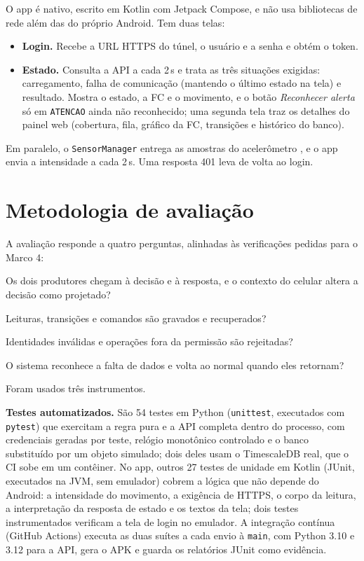 \documentclass[12pt,a4paper]{article}
\begin{document}
O app é nativo, escrito em Kotlin com Jetpack Compose, e não usa bibliotecas de rede além das do próprio Android.
Tem duas telas:
\begin{itemize}
  \item \textbf{Login.} Recebe a URL HTTPS do túnel, o usuário e a senha e obtém o token.
  \item \textbf{Estado.} Consulta a API a cada 2\,s e trata as três situações exigidas: carregamento, falha de comunicação (mantendo o último estado na tela) e resultado. Mostra o estado, a FC e o movimento, e o botão \emph{Reconhecer alerta} só em \texttt{ATENCAO} ainda não reconhecido; uma segunda tela traz os detalhes do painel web (cobertura, fila, gráfico da FC, transições e histórico do banco).
\end{itemize}
Em paralelo, o \texttt{SensorManager} entrega as amostras do acelerômetro \cite{androidsensors}, e o app envia a intensidade a cada 2\,s.
Uma resposta 401 leva de volta ao login.

\section{Metodologia de avaliação}\label{sec:metodo}

A avaliação responde a quatro perguntas, alinhadas às verificações pedidas para o Marco 4:
\begin{description}[leftmargin=0.6cm, style=nextline]
  \item[Q1 -- Fluxo e contexto] Os dois produtores chegam à decisão e à resposta, e o contexto do celular altera a decisão como projetado?
  \item[Q2 -- Persistência] Leituras, transições e comandos são gravados e recuperados?
  \item[Q3 -- Segurança] Identidades inválidas e operações fora da permissão são rejeitadas?
  \item[Q4 -- Falha e recuperação] O sistema reconhece a falta de dados e volta ao normal quando eles retornam?
\end{description}

Foram usados três instrumentos.

\textbf{Testes automatizados.}
São 54 testes em Python (\texttt{unittest}, executados com \texttt{pytest}) que exercitam a regra pura e a API completa dentro do processo, com credenciais geradas por teste, relógio monotônico controlado e o banco substituído por um objeto simulado; dois deles usam o TimescaleDB real, que o CI sobe em um contêiner.
No app, outros 27 testes de unidade em Kotlin (JUnit, executados na JVM, sem emulador) cobrem a lógica que não depende do Android: a intensidade do movimento, a exigência de HTTPS, o corpo da leitura, a interpretação da resposta de estado e os textos da tela; dois testes instrumentados verificam a tela de login no emulador.
A integração contínua (GitHub Actions) executa as duas suítes a cada envio à \texttt{main}, com Python 3.10 e 3.12 para a API, gera o APK e guarda os relatórios JUnit como evidência.
\end{document}
